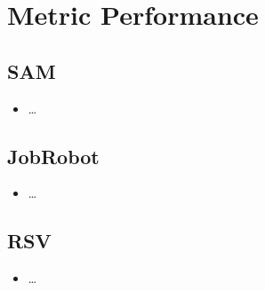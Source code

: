 \documentclass{beamer}
\begin{document}
\section{Metric Performance}
\subsection{SAM}
\begin{frame}
\begin{itemize}
    \item \ldots{}
\end{itemize}
\end{frame}

\subsection{JobRobot}
\begin{frame}
\begin{itemize}
    \item \ldots{}
\end{itemize}
\end{frame}

\subsection{RSV}
\begin{frame}
\begin{itemize}
    \item \ldots{}
\end{itemize}
\end{frame}
\end{document}
